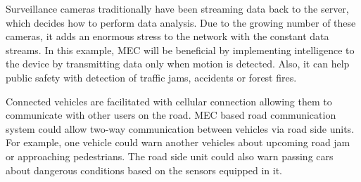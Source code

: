 Surveillance cameras traditionally have been streaming data back to the server, which decides how to perform data analysis. Due to the growing number of these cameras, it adds an enormous stress to the network with the constant data streams. In this example, MEC will be beneficial by implementing intelligence to the device by transmitting data only when motion is detected. Also, it can help public safety with detection of traffic jams, accidents or forest fires.

Connected vehicles are facilitated with cellular connection allowing them to communicate with other users on the road. MEC based road communication system could allow two-way communication between vehicles via road side units. For example, one vehicle could warn another vehicles about upcoming road jam or approaching pedestrians. The road side unit could also warn passing cars about dangerous conditions based on the sensors equipped in it. \cite{Abbas2018}


